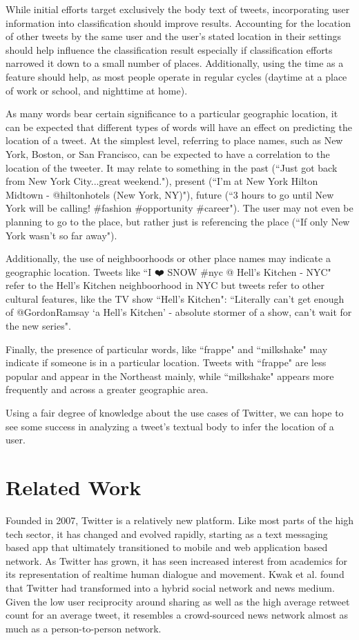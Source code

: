 \documentclass[midd]{thesis}
\begin{document}
While initial efforts target exclusively the body text of tweets, incorporating user information into classification should improve results. Accounting for the location of other tweets by the same user and the user's stated location in their settings should help influence the classification result especially if classification efforts narrowed it down to a small number of places. Additionally, using the time as a feature should help, as most people operate in regular cycles (daytime at a place of work or school, and nighttime at home).

As many words bear certain significance to a particular geographic location, it can be expected that different types of words will have an effect on predicting the location of a tweet. At the simplest level, referring to place names, such as New York, Boston, or San Francisco, can be expected to have a correlation to the location of the tweeter. It may relate to something in the past (``Just got back from New York City...great weekend."), present (``I'm at New York Hilton Midtown - @hiltonhotels (New York, NY)"), future (``3 hours to go until New York will be calling! #fashion #opportunity #career"). The user may not even be planning to go to the place, but rather just is referencing the place (``If only New York wasn't so far away").

Additionally, the use of neighboorhoods or other place names may indicate a geographic location. Tweets like ``I ❤️ SNOW #nyc @ Hell's Kitchen - NYC" refer to the Hell's Kitchen neighboorhood in NYC but tweets refer to other cultural features, like the TV show ``Hell's Kitchen": ``Literally can't get enough of @GordonRamsay `a Hell's Kitchen' - absolute stormer of a show, can't wait for the new series".

Finally, the presence of particular words, like ``frappe" and ``milkshake" may indicate if someone is in a particular location. Tweets with ``frappe" are less popular and appear in the Northeast mainly, while ``milkshake" appears more frequently and across a greater geographic area.

Using a fair degree of knowledge about the use cases of Twitter, we can hope to see some success in analyzing a tweet's textual body to infer the location of a user.

\chapter{Related Work}

Founded in 2007, Twitter is a relatively new platform. Like most parts of the high tech sector, it has changed and evolved rapidly, starting as a text messaging based app that ultimately transitioned to mobile and web application based network. As Twitter has grown, it has seen increased interest from academics for its representation of realtime human dialogue and movement. Kwak et al. \cite{kwak2010twitter} found that Twitter had transformed into a hybrid social network and news medium. Given the low user reciprocity around sharing as well as the high average retweet count for an average tweet, it resembles a crowd-sourced news network almost as much as a person-to-person network.
\end{document}

